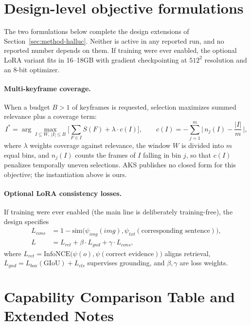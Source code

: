 \documentclass[10pt]{article}
\begin{document}
\section{Design-level objective formulations}\label{app:lora}

The two formulations below complete the design extensions of Section~\ref{sec:method-halluc}. Neither is active in any reported run, and no reported number depends on them. If training were ever enabled, the optional LoRA variant fits in 16--18GB with gradient checkpointing at $512^2$ resolution and an 8-bit optimizer.

\paragraph{Multi-keyframe coverage.} When a budget $B > 1$ of keyframes is requested, selection maximizes summed relevance plus a coverage term:
\begin{equation}
I^* = \arg\max_{I \subseteq W,\, |I| \le B} \Big[ \sum_{F \in I} S(F) + \lambda \cdot c(I) \Big], \qquad c(I) = -\sum_{j=1}^{m} \Big|\, n_j(I) - \frac{|I|}{m} \,\Big|,
\end{equation}
where $\lambda$ weights coverage against relevance, the window $W$ is divided into $m$ equal bins, and $n_j(I)$ counts the frames of $I$ falling in bin $j$, so that $c(I)$ penalizes temporally uneven selections. AKS \citep{aks2502} publishes no closed form for this objective; the instantiation above is ours.

\paragraph{Optional LoRA consistency losses.} If training were ever enabled (the main line is deliberately training-free), the design specifies
\begin{align}
L_{cons} &= 1 - \mathrm{sim}\big(\psi_{img}(img), \psi_{txt}(\text{corresponding sentence})\big), \\
L &= L_{ret} + \beta \cdot L_{gnd} + \gamma \cdot L_{cons},
\end{align}
where $L_{ret} = \mathrm{InfoNCE}\big(\psi(o), \psi(\text{correct evidence})\big)$ aligns retrieval, $L_{gnd} = L_{box}(\mathrm{GIoU}) + L_{cls}$ supervises grounding, and $\beta, \gamma$ are loss weights.


\section{Capability Comparison Table and Extended Notes}
\label{app:table1}
\end{document}
